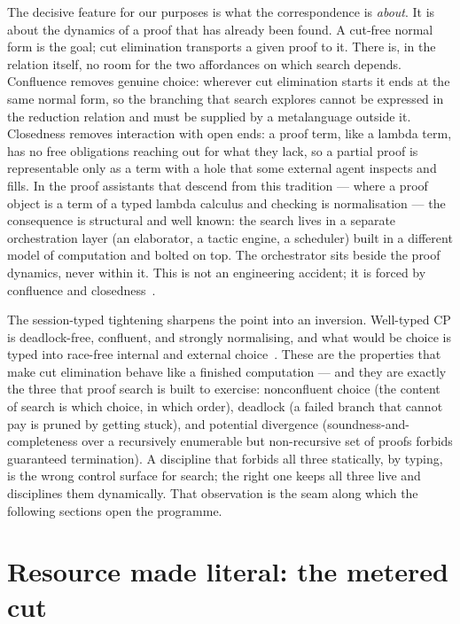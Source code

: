 \documentclass[11pt]{article}
\theoremstyle{definition}
\theoremstyle{plain}
\begin{document}
The decisive feature for our purposes is what the correspondence is \emph{about}.
It is about the dynamics of a proof that has already been found. A cut-free
normal form is the goal; cut elimination transports a given proof to it. There
is, in the relation itself, no room for the two affordances on which search
depends. Confluence removes genuine choice: wherever cut elimination starts it
ends at the same normal form, so the branching that search explores cannot be
expressed in the reduction relation and must be supplied by a metalanguage
outside it. Closedness removes interaction with open ends: a proof term, like a
lambda term, has no free obligations reaching out for what they lack, so a
partial proof is representable only as a term with a hole that some external
agent inspects and fills. In the proof assistants that descend from this
tradition --- where a proof object is a term of a typed lambda calculus and
checking is normalisation --- the consequence is structural and well known: the
search lives in a separate orchestration layer (an elaborator, a tactic engine,
a scheduler) built in a different model of computation and bolted on top. The
orchestrator sits beside the proof dynamics, never within it. This is not an
engineering accident; it is forced by confluence and closedness~\cite{NoteIV}.

The session-typed tightening sharpens the point into an inversion. Well-typed
CP is deadlock-free, confluent, and strongly normalising, and what would be
choice is typed into race-free internal and external choice~\cite{Wadler14}.
These are the properties that make cut elimination behave like a finished
computation --- and they are exactly the three that proof search is built to
exercise: nonconfluent choice (the content of search is which choice, in which
order), deadlock (a failed branch that cannot pay is pruned by getting stuck),
and potential divergence (soundness-and-completeness over a recursively
enumerable but non-recursive set of proofs forbids guaranteed termination). A
discipline that forbids all three statically, by typing, is the wrong control
surface for search; the right one keeps all three live and disciplines them
dynamically. That observation is the seam along which the following sections
open the programme.

\section{Resource made literal: the metered cut}\label{sec:resource}
\end{document}
